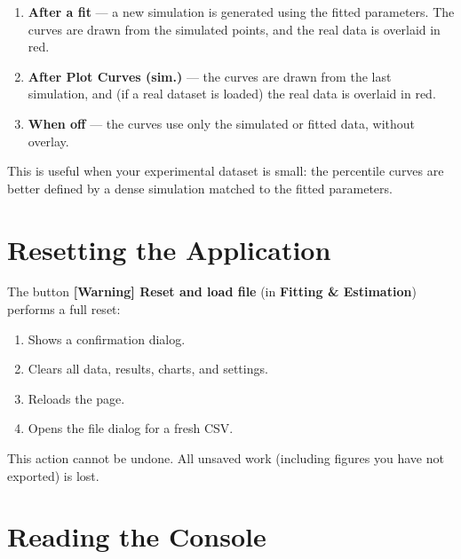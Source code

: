 \documentclass[11pt,a4paper]{article}
\begin{document}
\begin{enumerate}[leftmargin=1.4em]
  \item \textbf{After a fit} --- a new simulation is generated using the fitted parameters. The curves are drawn from the simulated points, and the real data is overlaid in red.
  \item \textbf{After Plot Curves (sim.)} --- the curves are drawn from the last simulation, and (if a real dataset is loaded) the real data is overlaid in red.
  \item \textbf{When off} --- the curves use only the simulated or fitted data, without overlay.
\end{enumerate}

\begin{tipbox}
This is useful when your experimental dataset is small: the percentile curves are better defined by a dense simulation matched to the fitted parameters.
\end{tipbox}

\section{Resetting the Application}

The button \textbf{\textbf{[Warning]} Reset and load file} (in \textbf{Fitting \& Estimation}) performs a full reset:

\begin{enumerate}[leftmargin=1.4em]
  \item Shows a confirmation dialog.
  \item Clears all data, results, charts, and settings.
  \item Reloads the page.
  \item Opens the file dialog for a fresh CSV.
\end{enumerate}

\begin{warnbox}[Irreversible]
This action cannot be undone. All unsaved work (including figures you have not exported) is lost.
\end{warnbox}

\section{Reading the Console}
\end{document}
